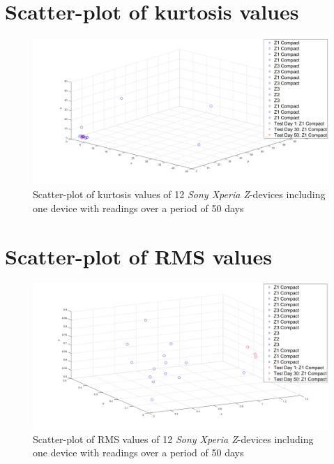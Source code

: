 \section*{Scatter-plot of kurtosis values}
\begin{figure}[H]
	\centering
	\includegraphics[scale=.3]{img/features/kurt}
	\caption{Scatter-plot of kurtosis values of 12  \textit{Sony Xperia Z}-devices including one device with readings over a period of 50 days}
	\label{fig:feature:kurt}
\end{figure}

\section*{Scatter-plot of RMS values}
\begin{figure}[H]
	\centering
	\includegraphics[scale=.3]{img/features/rms}
	\caption{Scatter-plot of RMS values of 12  \textit{Sony Xperia Z}-devices including one device with readings over a period of 50 days}
	\label{fig:feature:rms}
\end{figure}

